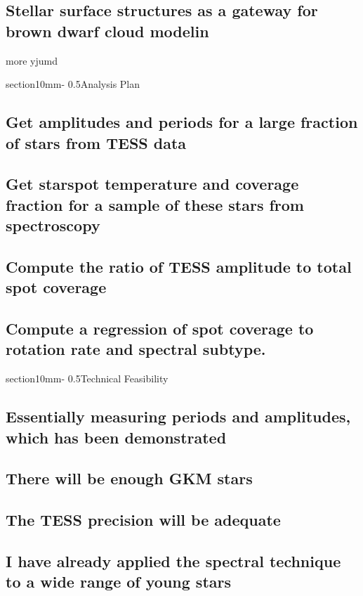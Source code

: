 \documentclass[letterpaper,11pt]{article}
\makeatletter
\renewcommand{\section}{\@startsection%
{section}{1}{0mm}{-\baselineskip}%
{0.5\baselineskip}{\normalfont\Large\bfseries}}%
\makeatother
\begin{document}
\subsection{Stellar surface structures as a gateway for brown dwarf cloud modelin}
more yjumd


\section{Analysis Plan}

\subsection{Get amplitudes and periods for a large fraction of stars from TESS data}
\subsection{Get starspot temperature and coverage fraction for a sample of these stars from spectroscopy}
\subsection{Compute the ratio of TESS amplitude to total spot coverage}
\subsection{Compute a regression of spot coverage to rotation rate and spectral subtype.}


\section{Technical Feasibility}

\subsection{Essentially measuring periods and amplitudes, which has been demonstrated}
\subsection{There will be enough GKM stars}
\subsection{The TESS precision will be adequate}
\subsection{I have already applied the spectral technique to a wide range of young stars}
\end{document}
